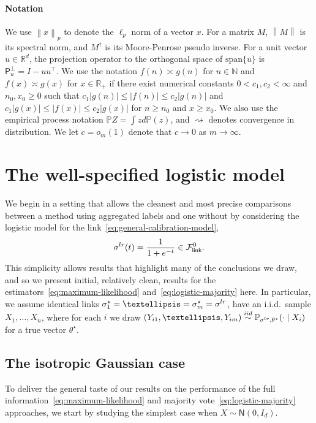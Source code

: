 \documentclass[11pt]{article}
\newcommand{\Prb}{\mathbb{P}}
\newcommand{\R}{\mathbb{R}} %
\newcommand{\norm}[1]{\left\|{#1}\right\|} %
\newcommand{\normal}{\mathsf{N}}
\newcommand{\lr}{^{\textup{lr}}}
\newcommand{\proj}{\mathsf{P}}
\newcommand{\fsymlink}{\mathcal{F}_{\mathsf{link}}^0}
\newcommand{\<}{\langle} %
\renewcommand{\>}{\rangle}
\newcommand{\simiid}{\stackrel{\textup{iid}}{\sim}}
\newcommand{\cd}{\rightsquigarrow}
\newcommand{\opt}{^\star}
\begin{document}
\paragraph{Notation}
We use $\norm{x}_p$ to denote the $\ell_p$ norm of a vector $x$. For a
matrix $M$, $\norm{M}$ is its spectral norm, and $M^\dagger$ is its
Moore-Penrose pseudo inverse. For a unit vector $u \in \R^d$, the projection
operator to the orthogonal space of $\mathrm{span}\{u\}$ is $\proj_{u}^\perp
= I - u u^\top$. We use the notation $f(n) \asymp g(n)$ for $n \in
\mathbb{N}$ and $f(x) \asymp g(x)$ for $x \in \R_+$ if there exist numerical
constants $0 < c_1, c_2 < \infty$ and $n_0, x_0 \geq 0$ such that $c_1|g(n)| \leq |f(n)|
\leq c_2|g(n)|$ and $c_1|g(x)| \leq |f(x)| \leq c_2|g(x)|$ for $n \geq n_0$
and $x \geq x_0$. We also use the empirical process notation $\Prb Z = \int
z d\Prb(z)$, and $\cd$ denotes convergence in distribution.
We let $c=o_m(1)$ denote that $c \to 0$ as $m \to \infty$.


\section{The well-specified logistic model}\label{sec:well-sepcified-mod}

We begin in a setting that allows the cleanest and most precise comparisons
between a method using aggregated labels and one without by considering the
logistic model for the link~\eqref{eq:general-calibration-model},
\begin{align*}
  \sigma\lr(t) = \frac{1}{1 + e^{-t}} \in \fsymlink.
\end{align*}
This simplicity allows results that highlight many of the conclusions we
draw, and so we present initial, relatively clean, results for the
estimators~\eqref{eq:maximum-likelihood} and~\eqref{eq:logistic-majority}
here.  In particular, we assume identical links $\sigma_1\opt = \dots =
\sigma_m\opt = \sigma\lr$, have an i.i.d.\ sample $X_1, \ldots, X_n$, where
for each $i$ we draw $(Y_{i1}, \ldots, Y_{im}) \simiid
\Prb_{\sigma\lr,\theta\opt}(\cdot \mid X_i)$ for a true vector $\theta\opt$.


\subsection{The isotropic Gaussian case} \label{sec:gauss}

To deliver the general taste of our results on the performance of the full
information~\eqref{eq:maximum-likelihood} and majority
vote~\eqref{eq:logistic-majority} approaches, we start by studying the
simplest case when $X \sim \normal(0, I_d)$.
\end{document}
